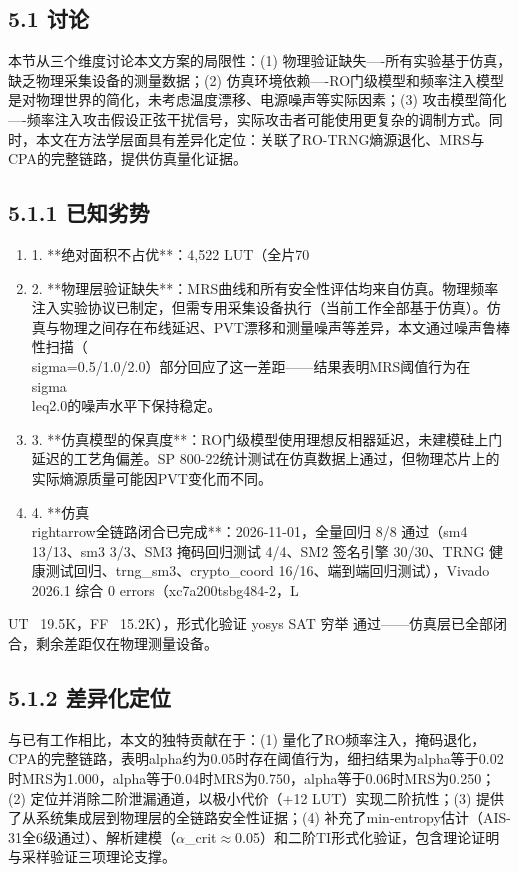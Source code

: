 \documentclass[journal]{IEEEtran}
\begin{document}
\subsection{5.1 讨论}

本节从三个维度讨论本文方案的局限性：(1) 物理验证缺失----所有实验基于仿真，缺乏物理采集设备的测量数据；(2) 仿真环境依赖----RO门级模型和频率注入模型是对物理世界的简化，未考虑温度漂移、电源噪声等实际因素；(3) 攻击模型简化----频率注入攻击假设正弦干扰信号，实际攻击者可能使用更复杂的调制方式。同时，本文在方法学层面具有差异化定位：关联了RO-TRNG熵源退化、MRS与CPA的完整链路，提供仿真量化证据。

\subsection{5.1.1 已知劣势}

\begin{enumerate}
\item 1. **绝对面积不占优**：4,522 LUT（全片70%
\item 2. **物理层验证缺失**：MRS曲线和所有安全性评估均来自仿真。物理频率注入实验协议已制定，但需专用采集设备执行（当前工作全部基于仿真）。仿真与物理之间存在布线延迟、PVT漂移和测量噪声等差异，本文通过噪声鲁棒性扫描（\\sigma=0.5/1.0/2.0）部分回应了这一差距——结果表明MRS阈值行为在\\sigma\\leq2.0的噪声水平下保持稳定。
\item 3. **仿真模型的保真度**：RO门级模型使用理想反相器延迟，未建模硅上门延迟的工艺角偏差。SP 800-22统计测试在仿真数据上通过，但物理芯片上的实际熵源质量可能因PVT变化而不同。
\item 4. **仿真\\rightarrow全链路闭合已完成**：2026-11-01，全量回归 8/8 通过（sm4 13/13、sm3 3/3、SM3 掩码回归测试 4/4、SM2 签名引擎 30/30、TRNG 健康测试回归、trng\_sm3、crypto\_coord 16/16、端到端回归测试），Vivado 2026.1 综合 0 errors（xc7a200tsbg484-2，L
\end{enumerate}UT ~19.5K，FF ~15.2K），形式化验证 yosys SAT 穷举 通过——仿真层已全部闭合，剩余差距仅在物理测量设备。

\subsection{5.1.2 差异化定位}

与已有工作相比，本文的独特贡献在于：(1) 量化了RO频率注入，掩码退化，CPA的完整链路，表明alpha约为0.05时存在阈值行为，细扫结果为alpha等于0.02时MRS为1.000，alpha等于0.04时MRS为0.750，alpha等于0.06时MRS为0.250；(2) 定位并消除二阶泄漏通道，以极小代价（+12 LUT）实现二阶抗性；(3) 提供了从系统集成层到物理层的全链路安全性证据；(4) 补充了min-entropy估计（AIS-31全6级通过）、解析建模（$\alpha$\_crit$\approx$0.05）和二阶TI形式化验证，包含理论证明与采样验证三项理论支撑。
\end{document}
